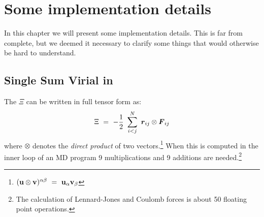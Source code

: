%
%
%
%
%
%
%

\chapter{Some implementation details}
In this chapter we will present some implementation details. This is
far from complete, but we deemed it necessary to clarify some things
that would otherwise be hard to understand.

\section{Single Sum Virial in {\gromacs}}
\label{sec:virial}
The  $\Xi$ can be written in full tensor form as:
\begin{equation}
\Xi~=~-\half~\sum_{i < j}^N~\rvij\otimes\Fvij
\end{equation}
where $\otimes$ denotes the {\em direct product} of two vectors.\footnote
{$({\bf u}\otimes{\bf v})^{\ab}~=~{\bf u}_{\al}{\bf v}_{\be}$} When this is 
computed in the inner loop of an MD program 9 multiplications and 9
additions are needed.\footnote{The calculation of 
Lennard-Jones and Coulomb forces is about 50 floating point operations.}

